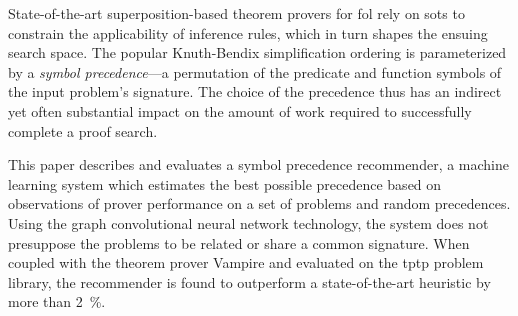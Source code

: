 


State-of-the-art superposition-based theorem provers for \acrlong{fol}
rely on \glspl{sot} to constrain the applicability of inference rules,
which in turn shapes the ensuing search space.
The popular Knuth-Bendix simplification ordering is parameterized by 
a \emph{symbol precedence}---a permutation of the predicate and function symbols
of the input problem's signature.
The choice of the precedence thus has an indirect yet often substantial impact
on the amount of work required to successfully complete a proof search.


This paper describes and evaluates a symbol precedence recommender,
a machine learning system which estimates the best possible precedence
based on observations of prover performance on a set of problems and random precedences.
Using the graph convolutional neural network technology,
the system does not presuppose the problems to be related or share a common signature. 
When coupled with the theorem prover Vampire and evaluated on the \acrshort{tptp} problem library,
the recommender is found to outperform a state-of-the-art heuristic by more than \SI{2}{\percent}.

\iffalse
This paper describes and evaluates a symbol precedence recommender based on a \acrlong{gcn}.
When trained on proof attempts that use random symbol precedences,
the recommender outperforms the state of the art heuristic by more than \SI{2}{\percent}.
The symbol precedences predicted by the recommender
specify Knuth-Bendix \glspl{sot}.
These orderings in turn guide the proof search in the state-of-the-art \acrlong{atp} Vampire
by constraining the inferences in the superposition calculus.
\todo{MS: uz i ty ``random symbol precedences'', kterymi to vypraveni nahore zacina potrebuji vampira.
Mozna bude lepsi, trochu nudne, zacit tim, odkud se berou a na co se pouzivaji precedence
a teprve pak rict, ze se z nich ucime a pak umime navrhovat nove, lepsi?}
The recommender is evaluated on \acrlong{fol} problems from the \acrshort{tptp} problem library.
\fi


